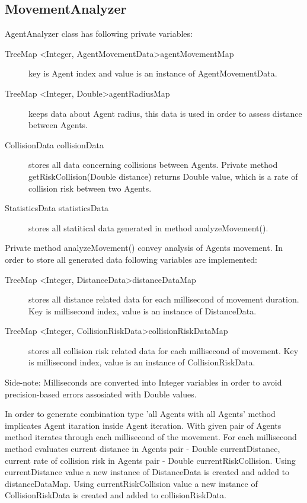 \documentclass[thesis=B,english]{FITthesis}[2019/12/23]
\begin{document}
\subsection{MovementAnalyzer}

AgentAnalyzer class has following private variables:
\begin{description}
\item[TreeMap \textless Integer,  AgentMovementData\textgreater agentMovementMap] key is Agent index and value is an instance of AgentMovementData.
\item[TreeMap \textless Integer, Double\textgreater agentRadiusMap] keeps data about Agent radius, this data is used in order to assess distance between Agents.
\item[CollisionData collisionData] stores all data concerning collisions between Agents. Private method getRiskCollision(Double distance) returns Double value, which is a rate of collision risk between two Agents.
\item[StatisticsData statisticsData] stores all statitical data generated in method analyzeMovement(). 
\end{description}

Private method analyzeMovement() convey analysis of Agents movement. In order to store all generated data following variables are implemented:
\begin{description}
\item[TreeMap \textless Integer, DistanceData\textgreater distanceDataMap] stores all distance related data for each millisecond of movement duration. Key is millisecond index, value is an instance of DistanceData.  
\item[TreeMap \textless Integer, CollisionRiskData\textgreater collisionRiskDataMap] stores all collision risk related data for each millisecond of movement. Key is millisecond index, value is an instance of CollisionRiskData.
\end{description}	

Side-note: Milliseconds are converted into Integer variables in order to avoid precision-based errors assosiated with Double values.

In order to generate combination type 'all Agents with all Agents' method implicates Agent itaration inside Agent iteration. With given pair of Agents method iterates through each millisecond of the movement. For each millisecond method evaluates current distance in Agents pair - Double currentDistance, current rate of collision risk in Agents pair - Double currentRiskCollision. Using currentDistance value a new instance of DistanceData is created and added to distanceDataMap. Using currentRiskCollision value a new instance of CollisionRiskData is created and added to collisionRiskData. 
\end{document}
